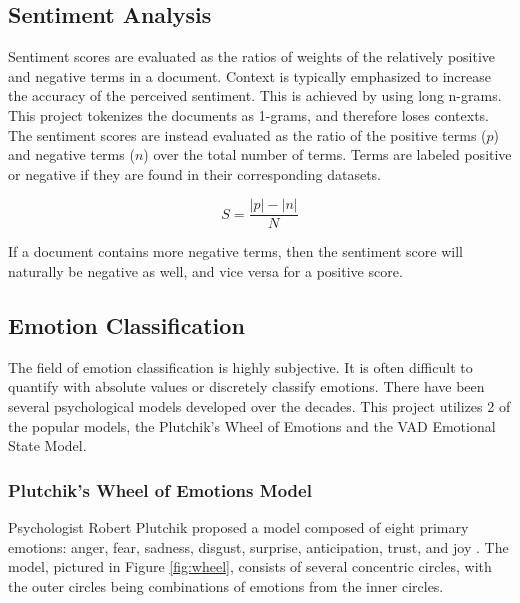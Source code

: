 \documentclass[11pt]{article}
\begin{document}
\subsection{Sentiment Analysis}

Sentiment scores are evaluated as the ratios of weights of the relatively positive and negative terms in a document. Context is typically emphasized to increase the accuracy of the perceived sentiment. This is achieved by using long n-grams. This project tokenizes the documents as 1-grams, and therefore loses contexts. The sentiment scores are instead evaluated as the ratio of the positive terms ($p$) and negative terms ($n$) over the total number of terms. Terms are labeled positive or negative if they are found in their corresponding datasets.

\begin{equation}
  S = \frac{|p| - |n|}{N}
\end{equation}

If a document contains more negative terms, then the sentiment score will naturally be negative as well, and vice versa for a positive score.

\subsection{Emotion Classification}

The field of emotion classification is highly subjective. It is often difficult to quantify with absolute values or discretely classify emotions. There have been several psychological models developed over the decades. This project utilizes 2 of the popular models, the Plutchik's Wheel of Emotions and the VAD Emotional State Model.

\subsubsection{Plutchik's Wheel of Emotions Model}

Psychologist Robert Plutchik proposed a model composed of eight primary emotions: anger, fear, sadness, disgust, surprise, anticipation, trust, and joy \cite{wheel}. The model, pictured in Figure \ref{fig:wheel}, consists of several concentric circles, with the outer circles being combinations of emotions from the inner circles.
\end{document}
